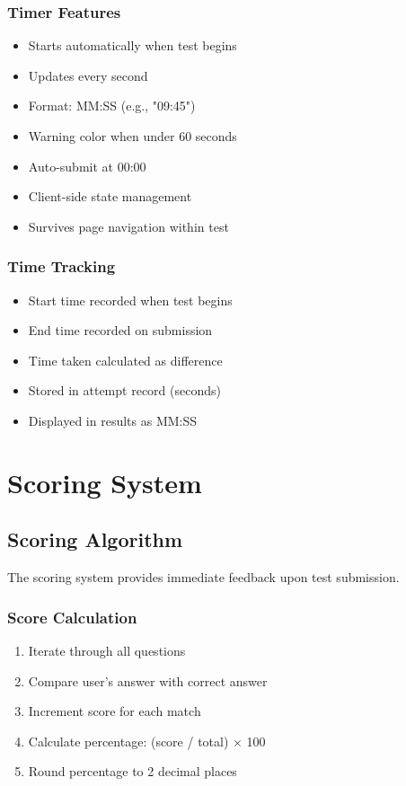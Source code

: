 \documentclass[12pt,a4paper]{report}
\begin{document}
\subsection{Timer Features}

\begin{itemize}
    \item Starts automatically when test begins
    \item Updates every second
    \item Format: MM:SS (e.g., "09:45")
    \item Warning color when under 60 seconds
    \item Auto-submit at 00:00
    \item Client-side state management
    \item Survives page navigation within test
\end{itemize}

\subsection{Time Tracking}

\begin{itemize}
    \item Start time recorded when test begins
    \item End time recorded on submission
    \item Time taken calculated as difference
    \item Stored in attempt record (seconds)
    \item Displayed in results as MM:SS
\end{itemize}

\chapter{Scoring System}

\section{Scoring Algorithm}

The scoring system provides immediate feedback upon test submission.

\subsection{Score Calculation}

\begin{enumerate}
    \item Iterate through all questions
    \item Compare user's answer with correct answer
    \item Increment score for each match
    \item Calculate percentage: (score / total) × 100
    \item Round percentage to 2 decimal places
\end{enumerate}
\end{document}
